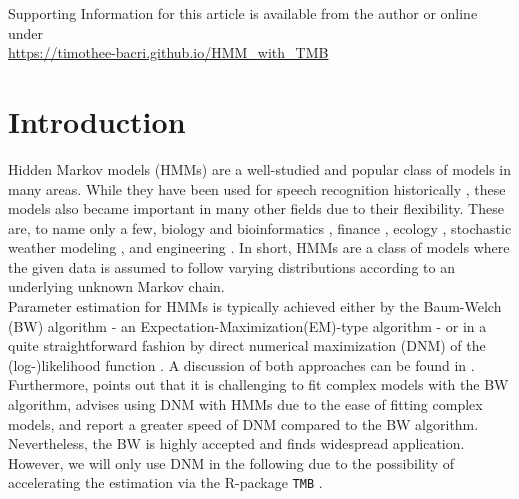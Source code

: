 \documentclass[]{interact}\usepackage[]{graphicx}\usepackage[dvipsnames]{xcolor}
\theoremstyle{plain}%
\theoremstyle{definition}
\theoremstyle{remark}
\begin{document}
\vspace*{1pc}
\noindent
\noindent Supporting Information for this article is available from the author or online under\\ %
\url{https://timothee-bacri.github.io/HMM_with_TMB}




\section{Introduction}
\label{sec:intro}

Hidden Markov models (HMMs) are a well-studied and popular class of models in many areas. While they have been used for speech recognition historically \citep[see, e.g.][]{juang, baum, rabiner, rabinera, fredkin}, these models also became important in many other fields due to their flexibility. These are, to name only a few, biology and bioinformatics \citep{schadt, durbin, eddy}, finance \citep{hamilton}, ecology \citep{mcclintock}, stochastic weather modeling \citep{lystig, ailliot}, and engineering \citep{mor}. In short, HMMs are a class of models where the given data is assumed to follow varying distributions according to an underlying unknown Markov chain.\\
Parameter estimation for HMMs is typically achieved either by the Baum-Welch (BW) algorithm \citep{bauma, dempster, rabiner, liporace, wu} - an Expectation-Maximization(EM)-type algorithm - or in a quite straightforward fashion by direct numerical maximization (DNM) of the (log-)likelihood function \citep[see, e.g.,][]{turner,macdonald}. A discussion of both approaches can be found in \cite[p.~358]{cappe}. Furthermore, \citep{lange} points out that it is challenging to fit complex models with the BW algorithm, \cite[pp. ~77-78]{zucchini} advises using DNM with HMMs due to the ease of fitting complex models, and \citep{altmana, turner} report a greater speed of DNM compared to the BW algorithm. Nevertheless, the BW is highly accepted and finds widespread application. However, we will only use DNM in the following due to the possibility of accelerating the estimation via the R-package {\tt{TMB}} \citep{kristensen, bacri}.
\end{document}
